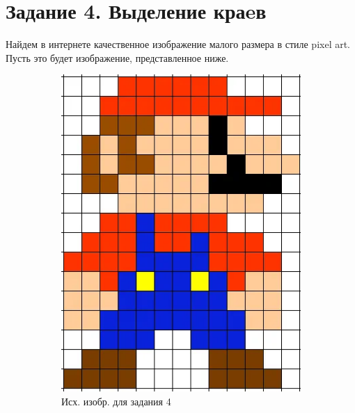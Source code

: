 \documentclass[a4paper, 12pt]{article}
\begin{document}
    \section{Задание 4. Выделение краeв}
    Найдем в интернете качественное изображение малого размера в стиле pixel art. Пусть это будет изображение, представленное ниже.
    \begin{figure}[H]
        \centering
        \begin{subfigure}{0.35\textwidth}
            \centering
            \includegraphics[width=\linewidth]{pa.png}
            \caption{Исх. изобр. для задания 4}
            \label{fig:padotpng}
        \end{subfigure}
        \hspace{10mm}
        \begin{subfigure}{0.35\textwidth}
            \centering

\end{subfigure}
\end{figure}
\end{document}
